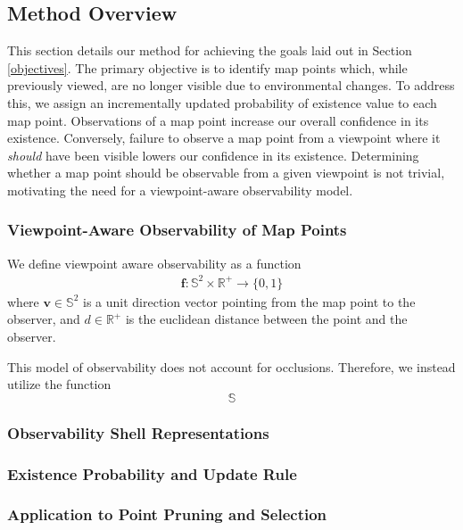 \subsection{Method Overview}

This section details our method for achieving the goals laid out in Section \ref{objectives}. The primary objective is to identify map points which, while previously viewed, are no longer visible due to environmental changes. To address this, we assign an incrementally updated probability of existence value to each map point. Observations of a map point increase our overall confidence in its existence. Conversely, failure to observe a map point from a viewpoint where it \textit{should} have been visible lowers our confidence in its existence. Determining whether a map point should be observable from a given viewpoint is not trivial, motivating the need for a viewpoint-aware observability model.

\subsubsection{Viewpoint-Aware Observability of Map Points}


We define viewpoint aware observability as a function
\begin{align*}
    \boldsymbol{f:}\mathbb{S}^2\times\mathbb{R}^+\rightarrow\{0,1\}
\end{align*}
where $\mathbf{v}\in\mathbb{S}^2$ is a unit direction vector pointing from the map point to the observer, and $d\in\mathbb{R}^+$ is the euclidean distance between the point and the observer.


This model of observability does not account for occlusions. Therefore, we instead utilize the function
$$
    \mathbb{S}
$$



\subsubsection{Observability Shell Representations}

\subsubsection{Existence Probability and Update Rule}

\subsubsection{Application to Point Pruning and Selection}
